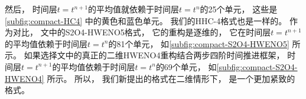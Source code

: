 然后，
时间层$t=t^{n+1}$的平均值就依赖于时间层$t=t^n$的25个单元，
这些是\cref{subfig:compact-HC4} 中的黄色和蓝色单元。
我们的HHC-4格式也是一样的。
作为对比，
文\cite{du2018hermite}中的S2O4-HWENO5格式，
它的重构是逐维的，
它在时间层$t=t^{n+1}$的平均值依赖于时间层$t=t^n$的81个单元，
如\cref{subfig:compact-S2O4-HWENO5} 所示。
如果选择文\cite{Qiu-Shu-2005}中的真正的二维HWENO4重构结合两步四阶时间推进框架，
时间层$t=t^{n+1}$的平均值依赖于时间层$t=t^n$的69个单元，
如\cref{subfig:compact-S2O4-HWENO4} 所示。
所以，
我们新提出的格式在二维情形下，
是一个更加紧致的格式。

\begin{figure}[htbp]
  \centering

\end{figure}
